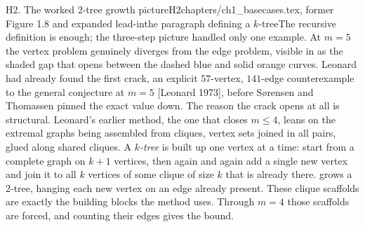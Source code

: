 \begin{offcut}{H2. The worked 2-tree growth picture}{H2}{chapters/ch1\_basecases.tex, former Figure 1.8 and expanded lead-in}{the paragraph defining a \(k\)-tree}{The recursive definition is enough; the three-step picture handled only one example.}
At $m = 5$ the vertex problem genuinely diverges from the edge problem, visible in  as the shaded gap that opens between the dashed blue and solid orange curves. Leonard had already found the first crack, an explicit $57$-vertex, $141$-edge counterexample to the general conjecture at $m = 5$ [Leonard 1973], before S{\o}rensen and Thomassen pinned the exact value down. The reason the crack opens at all is structural. Leonard's earlier method, the one that closes $m \le 4$, leans on the extremal graphs being assembled from cliques, vertex sets joined in all pairs, glued along shared cliques. A \emph{$k$-tree} is built up one vertex at a time: start from a complete graph on $k+1$ vertices, then again and again add a single new vertex and join it to all $k$ vertices of some clique of size $k$ that is already there.  grows a $2$-tree, hanging each new vertex on an edge already present. These clique scaffolds are exactly the building blocks the method uses. Through $m = 4$ those scaffolds are forced, and counting their edges gives the bound.

\begin{figure}[ht]
\centering
{}
\end{figure}
\end{offcut}
